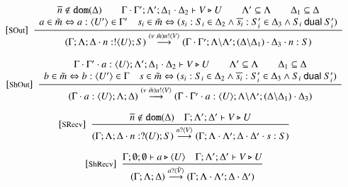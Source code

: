 \begin{figure}
	\[
	\begin{array}{c}
		{\footnotesize [\textrm{SOut}]}~~\displaystyle \frac { 
			\begin{array}{c}
				\overline{n} \notin \mathtt{dom}(\Delta)
				\qquad 
				\Gamma \cdot \Gamma'; \Lambda'; \Delta_1 \cdot \Delta_2 \vdash V \triangleright U
				\qquad
				\Lambda' \subseteq \Lambda
				\qquad
				\Delta_1 \subseteq \Delta\\
				a \in \tilde{m} \Leftrightarrow a: \langle U' \rangle \in \Gamma' \quad
				s_i \in \tilde{m} \Leftrightarrow (s_i: S_i \in \Delta_2 \wedge \overline{s_i}: S'_i \in \Delta_3 \wedge S_i \ \mathsf{dual}\  S'_i)
			\end{array}
		 }{ 
			(\Gamma; \Lambda; \Delta \cdot n: ! \langle U \rangle ; S) \stackrel{(\nu\ \tilde{m}) n ! \langle V \rangle}{\longrightarrow} (\Gamma \cdot \Gamma'; \Lambda\backslash\Lambda'; (\Delta\backslash\Delta_1) \cdot \Delta_3 \cdot n: S)			
		 } 
		\\[8mm]

		{\footnotesize [\textrm{ShOut}]}~~\displaystyle \frac { 
			\begin{array}{c}
				\Gamma \cdot \Gamma' \cdot a: \langle U \rangle; \Lambda'; \Delta_1 \cdot \Delta_2 \vdash V \triangleright U
				\qquad
				\Lambda' \subseteq \Lambda
				\qquad
				\Delta_1 \subseteq \Delta\\
				b \in \tilde{m} \Leftrightarrow b: \langle U' \rangle \in \Gamma \quad
				s \in \tilde{m} \Leftrightarrow (s_i: S_i \in \Delta_2 \wedge \overline{s_i}: S'_i \in \Delta_3 \wedge S_i \ \mathsf{dual}\  S'_i)
			\end{array}
		 }{ 
			(\Gamma\cdot a: \langle U \rangle; \Lambda; \Delta) \stackrel{(\nu\ \tilde{m}) a ! \langle V \rangle}{\longrightarrow} (\Gamma \cdot \Gamma'\cdot a: \langle U \rangle; \Lambda\backslash\Lambda'; (\Delta\backslash\Delta_1) \cdot \Delta_3)			
		 } 
		\\[8mm]


		{\footnotesize [\textrm{SRecv}]}~~\displaystyle \frac { 
			\overline{n} \notin \mathtt{dom}(\Delta) \quad \Gamma; \Lambda'; \Delta' \vdash V \triangleright U
		 }{ 
			(\Gamma; \Lambda; \Delta \cdot n: ? (U) ; S) \stackrel{n ? \langle V \rangle}{\longrightarrow} (\Gamma; \Lambda\cdot\Lambda'; \Delta\cdot\Delta' \cdot s: S)
		 } 
		\\[8mm]

		{\footnotesize [\textrm{ShRecv}]}~~\displaystyle \frac { 
			\Gamma; \emptyset; \emptyset \vdash a \triangleright \langle U \rangle
			\quad
			\Gamma; \Lambda'; \Delta' \vdash V \triangleright U
		 }{ 
			(\Gamma; \Lambda; \Delta) \stackrel{a ? \langle \tilde{V} \rangle}{\longrightarrow} (\Gamma; \Lambda\cdot\Lambda'; \Delta\cdot\Delta')
		 } 
		\\[8mm]


\end{array}\]
\end{figure}
